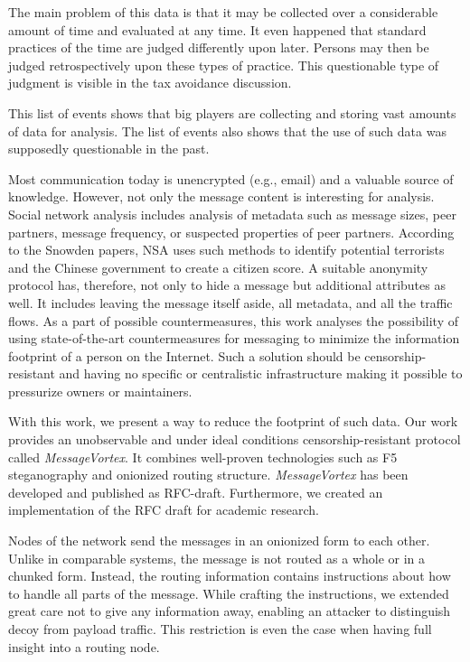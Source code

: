 \documentclass[acmsmall, screen, final, natbib=false]{acmart}
\begin{document}
	The main problem of this data is that it may be collected over a considerable amount of time and evaluated at any time. It even happened that standard practices of the time are judged differently upon later. Persons may then be judged retrospectively upon these types of practice. This questionable type of judgment is visible in the tax avoidance discussion\cite{Amat1999}. 
	
	This list of events shows that big players are collecting and storing vast amounts of data for analysis. The list of events also shows that the use of such data was supposedly questionable in the past. 
	
	Most communication today is unencrypted (e.g., email) and a valuable source of knowledge. However, not only the message content is interesting for analysis. Social network analysis includes analysis of metadata such as message sizes, peer partners, message frequency, or suspected properties of peer partners. According to the Snowden papers\cite{Ackerman2013}, NSA uses such methods to identify potential terrorists and the Chinese government to create a citizen score\cite{socialCreditSystem}. A suitable anonymity protocol has, therefore, not only to hide a message but additional attributes as well. It includes leaving the message itself aside, all metadata, and all the traffic flows. As a part of possible countermeasures, this work analyses the possibility of using state-of-the-art countermeasures for messaging to minimize the information footprint of a person on the Internet. Such a solution should be censorship-resistant and having no specific or centralistic infrastructure making it possible to pressurize owners or maintainers. 
	
	With this work, we present a way to reduce the footprint of such data. Our work provides an unobservable and under ideal conditions censorship-resistant protocol called \emph{MessageVortex}. It combines well-proven technologies such as F5 steganography and onionized routing structure. \emph{MessageVortex} has been developed and published as RFC-draft\cite{MessageVortexRFC}. Furthermore, we created an implementation of the RFC draft for academic research. 
	
	Nodes of the network send the messages in an onionized form to each other. Unlike in comparable systems, the message is not routed as a whole or in a chunked form. Instead, the routing information contains instructions about how to handle all parts of the message. While crafting the instructions, we extended great care not to give any information away, enabling an attacker to distinguish decoy from payload traffic. This restriction is even the case when having full insight into a routing node.
	
\end{document}
